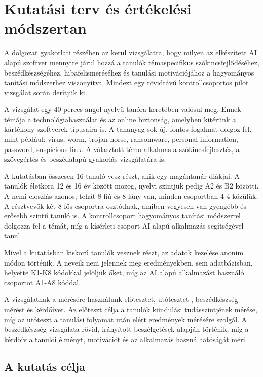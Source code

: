 \chapter{Kutatási terv és értékelési módszertan}

A dolgozat gyakorlati részében az kerül vizsgálatra, hogy milyen az elkészített AI alapú szoftver mennyire járul hozzá a tanulók témaspecifikus szókincsfejlődéséhez, beszédkészségéhez, hibafelismeréséhez és tanulási motivációjához a hagyományos tanítási módszerhez viszonyítva. Mindezt egy rövidtávú kontrollcsoportos pilot vizsgálat során derítjük ki.\cite{vanTeijlingen2001pilot}

A vizsgálat egy 40 perces angol nyelvű tanóra keretében valósul meg. Ennek témája a technológiahasználat és az online biztonság, amelyben kitérünk a kártékony szoftverek típusaira is. A tananyag sok új, fontos fogalmat dolgoz fel, mint például: virus, worm, trojan horse, ransomware, personal information, password, suspicious link. A választott téma alkalmas a szókincsfejlesztés, a szövegértés és beszédalapú gyakorlás vizsgálatára is.

A kutatásban összesen 16 tanuló vesz részt, akik egy magántanár diákjai. A tanulók életkora 12 és 16 év között mozog, nyelvi szintjük pedig A2 és B2 közötti. A nemi eloszlás azonos, tehát 8 fiú és 8 lány van, minden csoportban 4-4 közülük. A résztvevők két 8 fős csoportra osztódnak, amiben vegyesen van gyengébb és erősebb szintű tanuló is. A kontrollcsoport hagyományos tanítási módszerrel dolgozza fel a témát, míg a kísérleti csoport AI alapú alkalmazás segítségével tanul.

Mivel a kutatásban kiskorú tanulók vesznek részt, az adatok kezelése anonim módon történik. A neveik nem jelennek meg eredményekben, sem adatbázisban, helyette K1-K8 kódokkal jelöljük őket, míg az AI alapú alkalmazást használó csoportot A1-A8 kóddal. 

A vizsgálatnak a mérésére használunk előtesztet, utótesztet \cite{campbell1963experimental}, beszédkészség mérést és kérdőívet. Az előteszt célja a tanulók kiindulási tudásszintjének mérése, míg az utóteszt a tanulási folyamat után elért eredmények mérésére szolgál. A beszédkészség vizsgálata rövid, irányított beszélgetések alapján történik, míg a kérdőív a tanulói élményt, motivációt és az alkalmazás használhatóságát méri.

\section{A kutatás célja}

